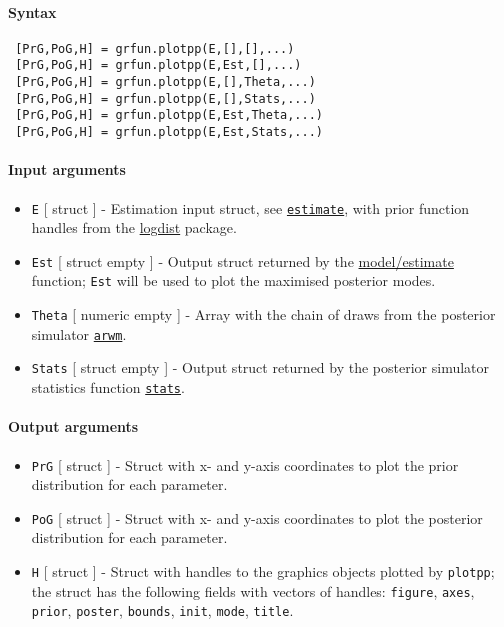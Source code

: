 


	\paragraph{Syntax}
 
 \begin{verbatim}
 [PrG,PoG,H] = grfun.plotpp(E,[],[],...)
 [PrG,PoG,H] = grfun.plotpp(E,Est,[],...)
 [PrG,PoG,H] = grfun.plotpp(E,[],Theta,...)
 [PrG,PoG,H] = grfun.plotpp(E,[],Stats,...)
 [PrG,PoG,H] = grfun.plotpp(E,Est,Theta,...)
 [PrG,PoG,H] = grfun.plotpp(E,Est,Stats,...)
 \end{verbatim}
 
 \paragraph{Input arguments}
 
 \begin{itemize}
 \item
   \texttt{E} {[} struct {]} - Estimation input struct, see
   \href{model/estimate}{\texttt{estimate}}, with prior function handles
   from the \href{logdist/Contents}{logdist} package.
 \item
   \texttt{Est} {[} struct \textbar{} empty {]} - Output struct returned
   by the \url{model/estimate} function; \texttt{Est} will be used to
   plot the maximised posterior modes.
 \item
   \texttt{Theta} {[} numeric \textbar{} empty {]} - Array with the chain
   of draws from the posterior simulator
   \href{poster/arwm}{\texttt{arwm}}.
 \item
   \texttt{Stats} {[} struct \textbar{} empty {]} - Output struct
   returned by the posterior simulator statistics function
   \href{poster/stats}{\texttt{stats}}.
 \end{itemize}
 
 \paragraph{Output arguments}
 
 \begin{itemize}
 \item
   \texttt{PrG} {[} struct {]} - Struct with x- and y-axis coordinates to
   plot the prior distribution for each parameter.
 \item
   \texttt{PoG} {[} struct {]} - Struct with x- and y-axis coordinates to
   plot the posterior distribution for each parameter.
 \item
   \texttt{H} {[} struct {]} - Struct with handles to the graphics
   objects plotted by \texttt{plotpp}; the struct has the following
   fields with vectors of handles: \texttt{figure}, \texttt{axes},
   \texttt{prior}, \texttt{poster}, \texttt{bounds}, \texttt{init},
   \texttt{mode}, \texttt{title}.
 \end{itemize}
 
